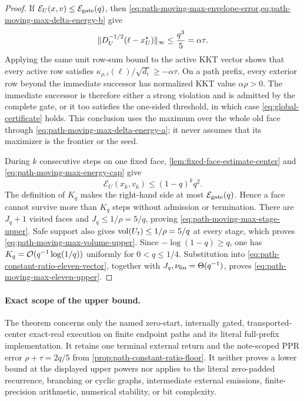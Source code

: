 \begin{proof}
If $\mathcal E_U(x,v)\leq\mathcal E_{\rm gate}(q)$, then
\cref{eq:path-moving-max-envelope-error,eq:path-moving-max-delta-energy-b}
give
\begin{equation*}
 \lVert D_U^{-1/2}(\ell-x_U^\star)\rVert_\infty
 \leq\frac{q^3}{5}=\alpha\tau.
\end{equation*}
Applying the same unit row-sum bound to the active KKT vector shows that every
active row satisfies
$\kappa_{\rho,i}(\ell)/\sqrt{d_i}\geq-\alpha\tau$.
On a path prefix, every exterior row beyond the immediate successor has
normalized KKT value $\alpha\rho>0$.  The immediate successor is therefore
either a strong violation and is admitted by the complete gate, or it too
satisfies the one-sided threshold, in which case
\cref{eq:global-certificate} holds.  This conclusion uses the maximum over
the whole old face through \cref{eq:path-moving-max-delta-energy-a}; it never
assumes that its maximizer is the frontier or the seed.

During $k$ consecutive steps on one fixed face,
\cref{lem:fixed-face-estimate-center} and
\cref{eq:path-moving-max-energy-cap} give
\begin{equation*}
 \mathcal E_U(x_k,v_k)\leq(1-q)^kq^2.
\end{equation*}
The definition of $K_q$ makes the right-hand side at most
$\mathcal E_{\rm gate}(q)$.  Hence a face cannot survive more than $K_q$
steps without admission or termination.  There are $J_q+1$ visited faces and
$J_q\leq1/\rho=5/q$, proving
\cref{eq:path-moving-max-stage-upper}.  Safe support also gives
$\operatorname{vol}(U_t)\leq1/\rho=5/q$ at every stage, which proves
\cref{eq:path-moving-max-volume-upper}.  Since
$-\log(1-q)\geq q$, one has
$K_q=\mathcal{O}(q^{-1}\log(1/q))$ uniformly for $0<q\leq1/4$.
Substitution into \cref{eq:path-constant-ratio-eleven-vector}, together with
$J_q,\nu_{\rm fin}=\Theta(q^{-1})$, proves
\cref{eq:path-moving-max-eleven-upper}.
\end{proof}

\paragraph{Exact scope of the upper bound.}
The theorem concerns only the named zero-start, internally gated,
transported-center exact-real execution on finite endpoint paths and its
literal full-prefix implementation.  It retains one terminal external return
and the note-scoped PPR error $\rho+\tau=2q/5$ from
\cref{prop:path-constant-ratio-floor}.  It neither proves a lower bound at
the displayed upper powers nor applies to the literal zero-padded recurrence,
branching or cyclic graphs, intermediate external emissions, finite-precision
arithmetic, numerical stability, or bit complexity.

